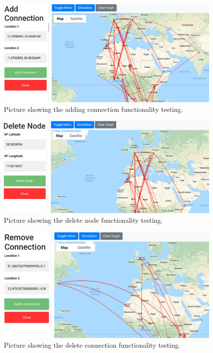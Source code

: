 \begin{figure}
    \begin{center}
        \includegraphics[width=1\linewidth]{sections/pictures-diagrams/addconnection.png}
    \end{center}
    \caption{Picture showing the adding connection functionality testing.}
    \label{figure:state}
\end{figure}
\begin{figure}
    \begin{center}
        \includegraphics[width=1\linewidth]{sections/pictures-diagrams/deletenodepicture.png}
    \end{center}
    \caption{Picture showing the delete node functionality testing.}
    \label{figure:state}
\end{figure}
\begin{figure}
    \begin{center}
        \includegraphics[width=1\linewidth]{sections/pictures-diagrams/removeconnection.png}
    \end{center}
    \caption{Picture showing the delete connection functionality testing.}
    \label{figure:state}
\end{figure}
